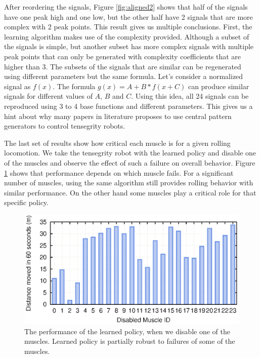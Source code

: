 \documentclass[twocolumn,10pt]{asme2ej}
\begin{document}
After reordering the signals, Figure \ref{fig:aligned2} shows that half of the signals have one peak high and one low, but the other half have 2 signals that are more complex with 2 peak points. This result gives us multiple conclusions. First, the learning algorithm makes use of the complexity provided. Although a subset of the signals is simple, but another subset has more complex signals with  multiple peak points that can only be generated with complexity coefficients that are higher than 3. The subsets of the signals that are similar can be regenerated using different parameters but the same formula. Let's consider a normalized signal as $f(x)$. The formula $g(x)=A+B*f(x+C)$ can produce similar signals for different values of $A$, $B$ and $C$. Using this idea, all 24 signals can be reproduced using 3 to 4 base functions and different parameters. This gives us a hint about why many papers in literature proposes to use central pattern generators to control tensegrity robots. 

The last set of results show how critical each muscle is for a given rolling locomotion. We take the tensegrity robot with the learned policy and disable one of the muscles and observe the effect of such a failure on overall behavior. Figure \ref{fig:disable1} shows that performance depends on which muscle fails. For a significant number of muscles, using the same algorithm still provides rolling behavior with similar performance.  On the other hand some muscles play a critical role for that specific policy.

\begin{figure}[t]
\centering
\includegraphics[width=\columnwidth]{results/testing-disabling1/disabled.eps}
\caption{The performance of the learned policy, when we disable one of the muscles. Learned policy is partially robust to failures of some of the muscles. }
\label{fig:disable1}
\end{figure}
\end{document}
